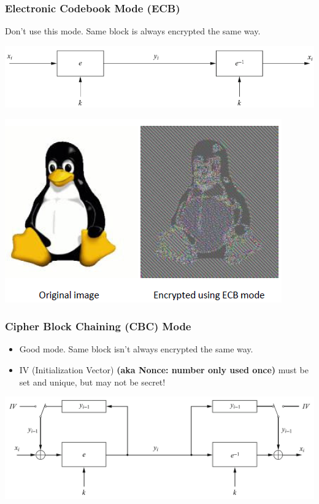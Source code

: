 \subsubsection{Electronic Codebook Mode (ECB)}
Don't use this mode. Same block is always encrypted the same way.\\
\begin{minipage}{0.6\linewidth}
  \includegraphics[width=0.8\linewidth]{images/EmbeddedSecurity/ecbBlock}
\end{minipage}
\begin{minipage}{0.4\linewidth}
  \includegraphics[width=0.9\linewidth]{images/EmbeddedSecurity/ecbImage}
\end{minipage}

\subsubsection{Cipher Block Chaining (CBC) Mode}
\begin{minipage}{0.3\linewidth}
  \begin{itemize}
    \item Good mode. Same block isn't always encrypted the same way.
    \item IV (Initialization Vector) \textbf{(aka Nonce: number only used once)} must be set and unique, but may not be secret!
  \end{itemize}
\end{minipage}
\begin{minipage}{0.7\linewidth}
  \includegraphics[width=\linewidth]{images/EmbeddedSecurity/cbcBlock}
\end{minipage}

